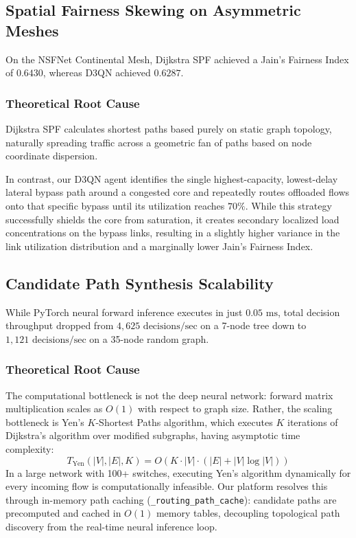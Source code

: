\subsection{Spatial Fairness Skewing on Asymmetric Meshes}
On the NSFNet Continental Mesh, Dijkstra SPF achieved a Jain's Fairness Index of $0.6430$, whereas D3QN achieved $0.6287$.

\subsubsection{Theoretical Root Cause}
Dijkstra SPF calculates shortest paths based purely on static graph topology, naturally spreading traffic across a geometric fan of paths based on node coordinate dispersion. 

In contrast, our D3QN agent identifies the single highest-capacity, lowest-delay lateral bypass path around a congested core and repeatedly routes offloaded flows onto that specific bypass until its utilization reaches $70\%$. While this strategy successfully shields the core from saturation, it creates secondary localized load concentrations on the bypass links, resulting in a slightly higher variance in the link utilization distribution and a marginally lower Jain's Fairness Index.

\subsection{Candidate Path Synthesis Scalability}
While PyTorch neural forward inference executes in just $0.05\text{ ms}$, total decision throughput dropped from $4,625\text{ decisions/sec}$ on a 7-node tree down to $1,121\text{ decisions/sec}$ on a 35-node random graph.

\subsubsection{Theoretical Root Cause}
The computational bottleneck is not the deep neural network: forward matrix multiplication scales as $O(1)$ with respect to graph size. Rather, the scaling bottleneck is Yen's $K$-Shortest Paths algorithm, which executes $K$ iterations of Dijkstra's algorithm over modified subgraphs, having asymptotic time complexity:
\begin{equation}
    T_{\text{Yen}}(|V|, |E|, K) = O(K \cdot |V| \cdot (|E| + |V| \log |V|))
\end{equation}
In a large network with 100+ switches, executing Yen's algorithm dynamically for every incoming flow is computationally infeasible. Our platform resolves this through in-memory path caching (\texttt{\_routing\_path\_cache}): candidate paths are precomputed and cached in $O(1)$ memory tables, decoupling topological path discovery from the real-time neural inference loop.


